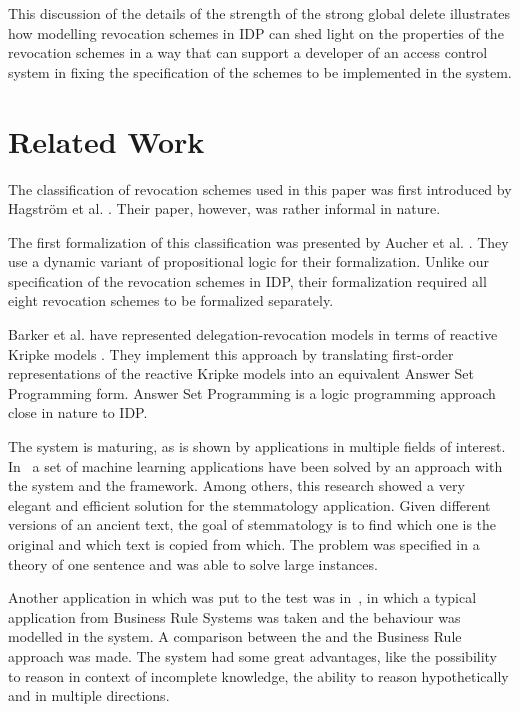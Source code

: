 \documentclass[runningheads]{llncs}
\newcommand{\logicname}[1]{\text{\sc #1}\xspace}
\newcommand{\idp}{\logicname{IDP}}
\newcommand{\fodot}{\logicname{FO(\ensuremath{\cdot})}}
\begin{document}
This discussion of the details of the strength of the strong global delete illustrates how modelling revocation schemes in IDP can shed light on the properties of the revocation schemes in a way that can support a developer of an access control system in fixing the specification of the schemes to be implemented in the system. 

\makeatletter{}\section{Related Work}
\label{related}

The classification of revocation schemes used in this paper was first introduced by Hagstr\"om et al. \cite{Hagstrom}. Their paper, however, was rather informal in nature. 

The first formalization of this classification was presented by Aucher et al. \cite{Aucher}. They use a dynamic variant of propositional logic for their formalization. Unlike our specification of the revocation schemes in IDP, their formalization required all eight revocation schemes to be formalized separately.

Barker et al. \cite{Barker} have represented delegation-revocation models in terms of reactive Kripke models \cite{Gabbay}. They implement this approach by translating first-order representations of the reactive Kripke models into an equivalent Answer Set Programming form. Answer Set Programming is a logic programming approach close in nature to IDP.

The \idp system is maturing, as is shown by applications in multiple fields of interest.
In~\cite{corr/Blockeel13} a set of machine learning applications have been solved by an approach with the \idp system and the \fodot framework. 
Among others, this research showed a very elegant and efficient solution for the stemmatology application. 
Given different versions of an ancient text, the goal of stemmatology is to find which one is the original and which text is copied from which.
The problem was specified in a theory of one sentence and was able to solve large instances. 

Another application in which \idp was put to the test was in~\cite{iclp/VanHertum13}, in which a typical application from Business Rule Systems was taken and the behaviour was modelled in the \idp system. 
A comparison between the \idp and the Business Rule approach was made. 
The \idp system had some great advantages, like the possibility to reason in context of incomplete knowledge, the ability to reason hypothetically and in multiple directions. 
 
\end{document}
